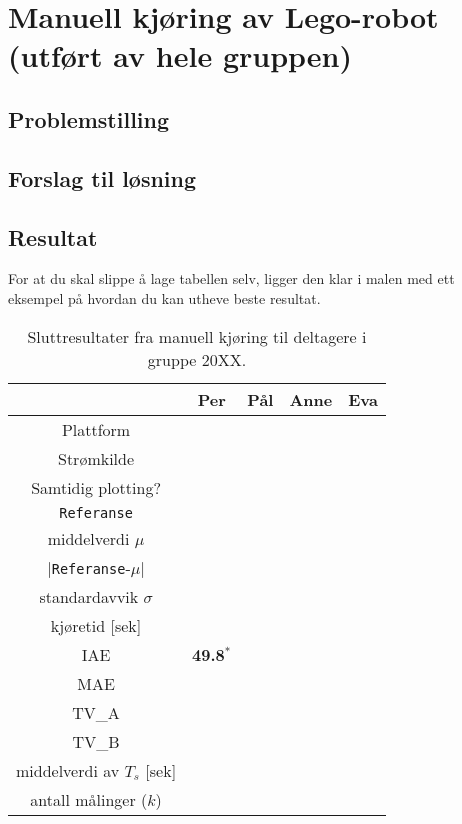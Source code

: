\documentclass{main.tex}[subfiles]
\begin{document}
\chapter{Manuell kjøring av Lego-robot (utført av hele gruppen)}\label{kap:manuell_kjoring}

\section{Problemstilling}

\section{Forslag til løsning}

\section{Resultat}

For at du skal slippe å lage tabellen selv, ligger den klar i malen
med ett eksempel på hvordan du kan utheve beste resultat.
\begin{table}[H]
  \centering
  \renewcommand{\arraystretch}{1.2}
  \caption{Sluttresultater fra manuell kjøring til deltagere i gruppe 20XX.}
  \hspace*{0mm}  \begin{tabular}{|c|c|c|c|c|}   \hline
                                 & Per              & Pål & Anne & Eva \\\hline\hline
    Plattform                    &                  &     &      &     \\\hline
    Strømkilde                   &                  &     &      &     \\\hline
    Samtidig plotting?           &                  &     &      &     \\\hline
    {\tt Referanse}              &                  &     &      &     \\\hline
    middelverdi $\mu$            &                  &     &      &     \\\hline
    |{\tt Referanse}-$\mu$|      &                  &     &      &     \\\hline
    standardavvik $\sigma$       &                  &     &      &     \\\hline
    kjøretid [sek]               &                  &     &      &     \\\hline
    IAE                          & {\bf 49.8}$^{*}$ &     &      &     \\\hline
    MAE                          &                  &     &      &     \\\hline
    TV\_A                        &                  &     &      &     \\\hline
    TV\_B                        &                  &     &      &     \\\hline
    middelverdi av $T_{s}$ [sek] &                  &     &      &     \\\hline
    antall målinger ($k$)        &                  &     &      &     \\\hline
  \end{tabular}    \label{tab:tall}
\end{table}
\end{document}
